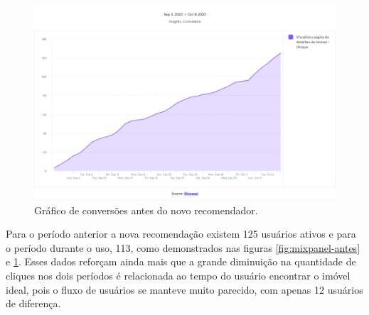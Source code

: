 \begin{figure}[H]
    \centering
    \includegraphics[scale=0.38]{figuras/desenvolvimento/mixpanel-depois.png}
    \caption[Gráfico de conversões antes do novo recomendador]{Gráfico de conversões antes do novo recomendador.}
    \label{fig:mixpanel-depois}
\end{figure}

Para o período anterior a nova recomendação existem 125 usuários ativos e para o período durante o uso, 113, como demonstrados nas figuras \ref{fig:mixpanel-antes} e \ref{fig:mixpanel-depois}. Esses dados reforçam ainda mais que a grande diminuição na quantidade de cliques nos dois períodos é relacionada ao tempo do usuário encontrar o imóvel ideal, pois o fluxo de usuários se manteve muito parecido, com apenas 12 usuários de diferença.














